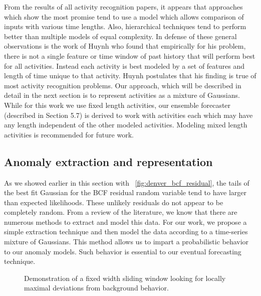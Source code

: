 From the results of all activity recognition papers, it appears that approaches which show the most promise tend to use a model which allows comparison of inputs with various time lengths.  Also, hierarchical techniques tend to perform better than multiple models of equal complexity.  In defense of these general observations is the work of Huynh \cite{Huynh2005} who found that empirically for his problem, there is not a single feature or time window of past history that will perform best for all activities.  Instead each activity is best modeled by a set of features and length of time unique to that activity.  Huynh postulates that his finding is true of most activity recognition problems.  Our approach, which will be described in detail in the next section is to represent activities as a mixture of Gaussians.  While for this work we use fixed length activities, our ensemble forecaster (described in Section 5.7) is derived to work with activities each which may have any length independent of the other modeled activities.  Modeling mixed length activities is recommended for future work.

\subsection{Anomaly extraction and representation}
As we showed earlier in this section with ~\ref{fig:denver_bcf_residual}, the tails of the best fit Gaussian for the BCF residual random variable tend to have larger than expected likelihoods.  These unlikely residuals do not appear to be completely random.  From a review of the literature, we know that there are numerous methods to extract and model this data.  For our work, we propose a simple extraction technique and then model the data according to a time-series mixture of Gaussians.  This method allows us to impart a probabilistic behavior to our anomaly models.  Such behavior is essential to our eventual forecasting technique.

\begin{figure}[]
	\begin{center}
	\end{center}
	\caption{Demonstration of a fixed width sliding window looking for locally maximal deviations from background behavior.}
	\label{fig:sliding_window}
\end{figure}

